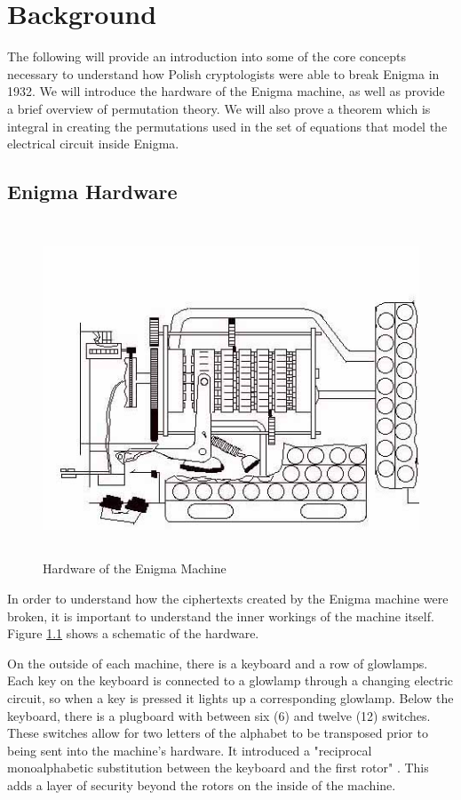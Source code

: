 \chapter{Background}\label{chap:background}

The following will provide an introduction into some of the core concepts necessary to understand how Polish cryptologists were able to break Enigma in 1932. We will introduce the hardware of the Enigma machine, as well as provide a brief overview of permutation theory. We will also prove a theorem which is integral in creating the permutations used in the set of equations that model the electrical circuit inside Enigma.

\section{Enigma Hardware}

\begin{figure}[h!]
\begin{centering}
  \includegraphics[height=10cm]{images/rotors.jpg}
  \caption{Hardware of the Enigma Machine}
  \label{fig:hardware1}
\end{centering}
\end{figure}

In order to understand how the ciphertexts created by the Enigma machine were broken, it is important to understand the inner workings of the machine itself. Figure \ref{fig:hardware1} shows a schematic of the hardware.

On the outside of each machine, there is a keyboard and a row of glowlamps. Each key on the keyboard is connected to a glowlamp through a changing electric circuit, so when a key is pressed it lights up a corresponding glowlamp. Below the keyboard, there is a plugboard with between six (6) and twelve (12) switches. These switches allow for two letters of the alphabet to be transposed prior to being sent into the machine's hardware. It introduced a "reciprocal monoalphabetic substitution between the keyboard and the first rotor" \cite{bw05}. This adds a layer of security beyond the rotors on the inside of the machine.

